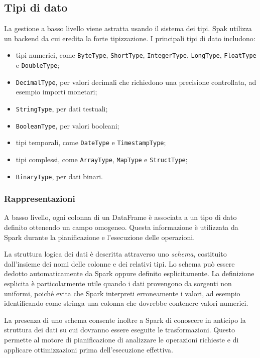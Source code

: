 \documentclass{article}
\begin{document}
\subsection{Tipi di dato}

La gestione a basso livello viene astratta usando il sistema dei tipi. %
Spak utilizza un backend da cui eredita la forte tipizzazione. %
I principali tipi di dato includono:

\begin{itemize}
\item tipi numerici, come \texttt{ByteType}, \texttt{ShortType}, \texttt{IntegerType}, \texttt{LongType}, \texttt{FloatType} e \texttt{DoubleType};
\item \texttt{DecimalType}, per valori decimali che richiedono una precisione controllata, ad esempio importi monetari;
\item \texttt{StringType}, per dati testuali;
\item \texttt{BooleanType}, per valori booleani;
\item tipi temporali, come \texttt{DateType} e \texttt{TimestampType};
\item tipi complessi, come \texttt{ArrayType}, \texttt{MapType} e \texttt{StructType};
\item \texttt{BinaryType}, per dati binari.
\end{itemize}

\subsubsection{Rappresentazioni}

A basso livello, ogni colonna di un DataFrame è %
associata a un tipo di dato definito ottenendo un campo omogeneo. Questa %
informazione è utilizzata da Spark durante la pianificazione e l'esecuzione delle operazioni.


La struttura logica dei dati è descritta attraverso uno \emph{schema}, %
costituito dall'insieme dei nomi delle colonne e dei relativi tipi. Lo %
schema può essere dedotto automaticamente da Spark oppure definito %
esplicitamente. La definizione esplicita è particolarmente utile quando %
i dati provengono da sorgenti non uniformi, poiché evita che Spark %
interpreti erroneamente i valori, ad esempio identificando come stringa %
una colonna che dovrebbe contenere valori numerici.

La presenza di uno schema consente inoltre a Spark di conoscere in %
anticipo la struttura dei dati su cui dovranno essere eseguite le %
trasformazioni. Questo permette al motore di pianificazione di analizzare %
le operazioni richieste e di applicare ottimizzazioni prima dell'esecuzione effettiva.
\end{document}
